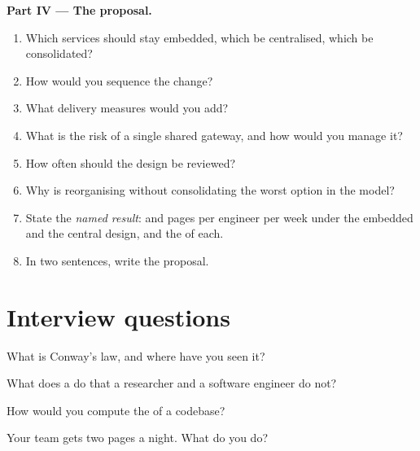\begin{problem}
\medskip\noindent\textbf{Part IV --- The proposal.}
\begin{enumerate}[resume]
\item Which services should stay embedded, which be centralised, which be consolidated?
\item How would you sequence the change?
\item What delivery measures would you add?
\item What is the risk of a single shared gateway, and how would you manage it?
\item How often should the design be reviewed?
\item Why is reorganising without consolidating the worst option in the model?
\item State the \emph{named result}:  and pages per engineer per week under the embedded and the central design, and the 
of each.
\item In two sentences, write the proposal.
\end{enumerate}
\end{problem}

\section{Interview questions}

\begin{interviewq}\label{iq:fm:engineering-organisation-design:1}
What is Conway's law, and where have you seen it?
\end{interviewq}

\begin{interviewq}\label{iq:fm:engineering-organisation-design:2}
What does a  do that a researcher and a software engineer do not?
\end{interviewq}

\begin{interviewq}\label{iq:fm:engineering-organisation-design:3}
How would you compute the  of a codebase?
\end{interviewq}

\begin{interviewq}\label{iq:fm:engineering-organisation-design:4}
Your team gets two pages a night. What do you do?
\end{interviewq}


